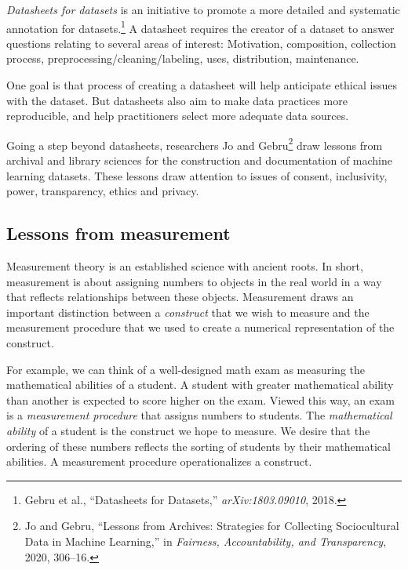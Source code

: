 \documentclass{tufte-book}
\begin{document}
\emph{Datasheets for datasets} is an initiative to promote a more
detailed and systematic annotation for datasets.\footnote{Gebru et al.,
  {``Datasheets for Datasets,''} \emph{arXiv:1803.09010}, 2018.} A
datasheet requires the creator of a dataset to answer questions relating
to several areas of interest: Motivation, composition, collection
process, preprocessing/cleaning/labeling, uses, distribution,
maintenance.

One goal is that process of creating a datasheet will help anticipate
ethical issues with the dataset. But datasheets also aim to make data
practices more reproducible, and help practitioners select more adequate
data sources.

Going a step beyond datasheets, researchers Jo and Gebru\footnote{Jo and
  Gebru, {``Lessons from Archives: Strategies for Collecting
  Sociocultural Data in Machine Learning,''} in \emph{Fairness,
  Accountability, and Transparency}, 2020, 306--16.} draw lessons from
archival and library sciences for the construction and documentation of
machine learning datasets. These lessons draw attention to issues of
consent, inclusivity, power, transparency, ethics and privacy.

\hypertarget{lessons-from-measurement}{%
\subsection{Lessons from measurement}\label{lessons-from-measurement}}

Measurement theory is an established science with ancient roots. In
short, measurement is about assigning numbers to objects in the real
world in a way that reflects relationships between these objects.
Measurement draws an important distinction between a \emph{construct}
that we wish to measure and the measurement procedure that we used to
create a numerical representation of the construct.

For example, we can think of a well-designed math exam as measuring the
mathematical abilities of a student. A student with greater mathematical
ability than another is expected to score higher on the exam. Viewed
this way, an exam is a \emph{measurement procedure} that assigns numbers
to students. The \emph{mathematical ability} of a student is the
construct we hope to measure. We desire that the ordering of these
numbers reflects the sorting of students by their mathematical
abilities. A measurement procedure operationalizes a
construct.
\end{document}
